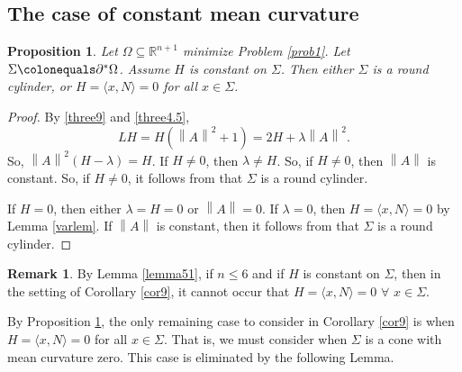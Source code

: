 \documentclass[12pt,reqno]{amsart}
\newtheorem{prop}[theorem]{Proposition}
\theoremstyle{definition}
\newtheorem{remark}[theorem]{Remark}
\renewcommand{\subset}{\subseteq}
\newcommand{\vnormt}[1]{\left\|#1\right\|}    %
\newcommand{\R}{\mathbb{R}}
\newcommand{\redA}{\partial^{*}\Omega}
\newcommand{\sdimn}{n}
\newcommand{\adimn}{n+1}
\newcommand{\scon}{\lambda}
\begin{document}
\subsection{The case of constant mean curvature}


\begin{prop}\label{thm10}
Let $\Omega\subset\R^{\adimn}$ minimize Problem \ref{prob1}.  Let $\Sigma\colonequals\redA$.  Assume $H$ is constant on $\Sigma$.  Then either $\Sigma$ is a round cylinder, or $H=\langle x,N\rangle=0$ for all $x\in\Sigma$.
\end{prop}
\begin{proof}
By \eqref{three9} and \eqref{three4.5},
$$LH=H(\vnormt{A}^{2}+1)=2H+\scon\vnormt{A}^{2}.$$
So, $\vnormt{A}^{2}(H-\scon)=H$.  If $H\neq0$, then $\scon\neq H$.  So, if $H\neq0$, then $\vnormt{A}$ is constant.  So, if $H\neq0$, it follows from \cite[p. 48-50]{colding12a} \cite[p.187-188]{huisken93} that $\Sigma$ is a round cylinder.

If $H=0$, then either $\scon=H=0$ or $\vnormt{A}=0$.  If $\scon=0$, then $H=\langle x,N\rangle=0$ by Lemma \ref{varlem}.  If $\vnormt{A}$ is constant, then it follows from \cite[p. 48-50]{colding12a} \cite[p.187-188]{huisken93} that $\Sigma$ is a round cylinder.
\end{proof}

\begin{remark}\label{dimrk}
By Lemma \ref{lemma51}, if $\sdimn\leq6$ and if $H$ is constant on $\Sigma$, then in the setting of Corollary \ref{cor9}, it cannot occur that $H=\langle x,N\rangle=0$ $\forall$ $x\in\Sigma$.
\end{remark}

By Proposition \ref{thm10}, the only remaining case to consider in Corollary \ref{cor9} is when $H=\langle x,N\rangle=0$ for all $x\in\Sigma$.  That is, we must consider when $\Sigma$ is a cone with mean curvature zero.   This case is eliminated by the following Lemma.
\end{document}
